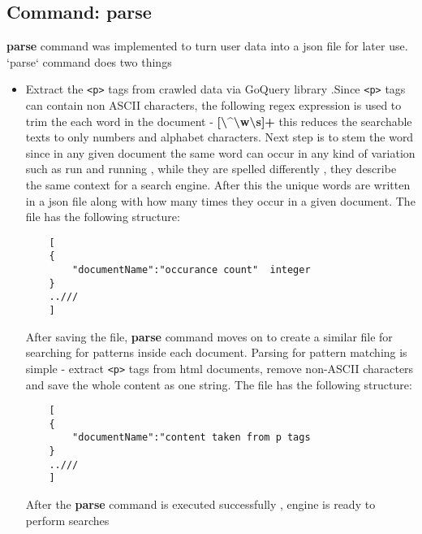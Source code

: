 \subsection{Command: parse}
\textbf{parse} command was implemented to turn user data into a json file for later use.
`parse` command does two things 
\begin{itemize}
    \item Extract the \texttt{\textless p\textgreater} tags from crawled data via GoQuery library \cite{goquery}.Since \texttt{\textless p\textgreater} tags can contain non ASCII characters, the following regex expression is used to trim the each word in the document - \textbf{[\textbackslash{}\^{}\textbackslash{}w\textbackslash{}s]+}
    this reduces the searchable texts to only numbers and alphabet characters. Next step is to stem the word since in any given document the same word can occur in any kind of variation such as run and running , while they are spelled differently , they describe the same context for a search engine. After this the unique words are written in a json file along with how many times they occur in a given document.
    The file has the following structure:
    \begin{lstlisting}
    [
    {
        "documentName":"occurance count"  integer
    }
    ..///
    ]
\end{lstlisting}
    After saving the file, \textbf{parse} command moves on to create a similar file for searching for patterns inside each document. Parsing for pattern matching is simple - extract \texttt{\textless p\textgreater} tags from html documents, remove non-ASCII characters and save the whole content as one string. The file has the following structure:
        \begin{lstlisting}
    [
    {
        "documentName":"content taken from p tags
    }
    ..///
    ]
\end{lstlisting}
    After the \textbf{parse} command is executed successfully , engine is ready to perform searches
\end{itemize}

